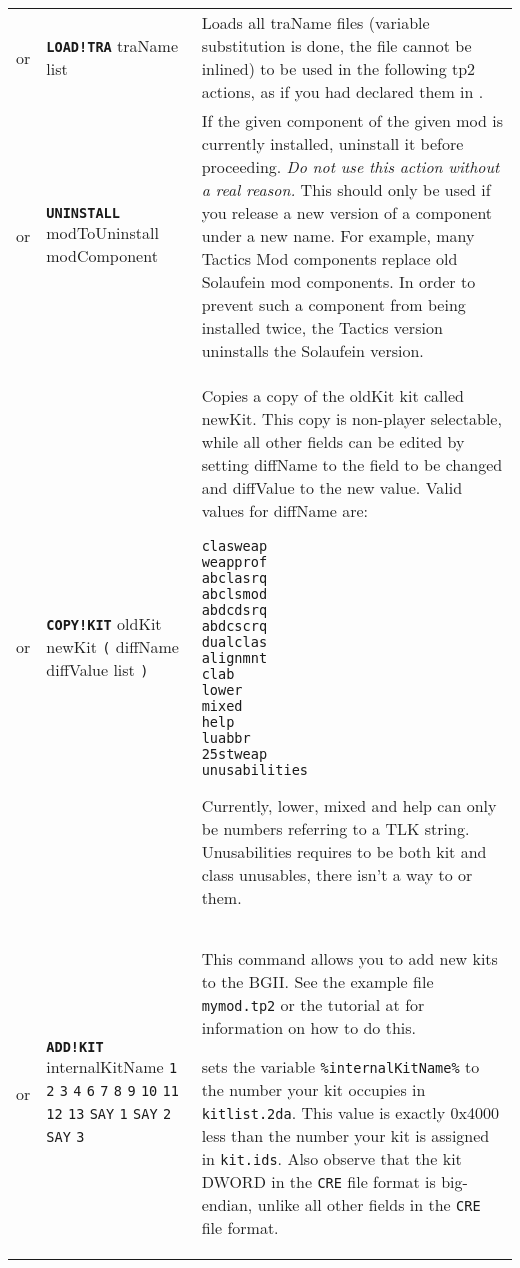 \documentclass{article}
\def\ttref#1{\ahrefloc{#1}{\tt #1}}
\def\DEFINE#1{{\tt \bf #1}\label{#1}\index{#1}}
\def\t#1{{\tt #1}}
\def\Slist{{\color{red} list }}
\begin{document}
\begin{tabular}{cp{10in}|p{10in}}
  or & \DEFINE{LOAD!TRA} traName \Slist &
    Loads all traName files (variable substitution is done, the file cannot be inlined)
    to be used in the following tp2 actions, as if you had declared them in \ttref{LANGUAGE}. \\
  or & \DEFINE{UNINSTALL} modToUninstall modComponent &
    If the given component of the given mod is currently installed,
    uninstall it before proceeding. \emph{Do not use this action without
	a real reason.} This
    should only be used if you release a new version of a component under a
    new name. For example, many Tactics Mod components replace old
    Solaufein mod components. In order to prevent such a component from
    being installed twice, the Tactics version uninstalls the Solaufein
    version.  \\
  or & \DEFINE{COPY!KIT} oldKit newKit \verb+(+ diffName diffValue \Slist
  \verb+)+ &
    Copies a copy of the oldKit kit called newKit. This copy is non-player
    selectable, while all other fields can be edited by setting diffName to
    the field to be changed and diffValue to the new value. Valid values for
    diffName are:
\begin{verbatim}
clasweap
weapprof
abclasrq
abclsmod
abdcdsrq
abdcscrq
dualclas
alignmnt
clab
lower
mixed
help
luabbr
25stweap
unusabilities
\end{verbatim}
    Currently, lower, mixed and help can only be numbers referring to a TLK
    string. Unusabilities requires to be both kit and class unusables, there
    isn't a way to \ttref{BAND} or \ttref{BOR} them.
    \\
  or & \DEFINE{ADD!KIT} internalKitName \t{\ttref{String}1}
       \t{\ttref{String}2} \t{\ttref{String}3} \t{\ttref{String}4}
       \t{\ttref{String}6} \t{\ttref{String}7} \t{\ttref{String}8}
       \t{\ttref{String}9} \t{\ttref{String}10} \t{\ttref{String}11}
       \t{\ttref{String}12} \t{\ttref{String}13} \t{SAY} \t{\ttref{text}1}
       \t{SAY} \t{\ttref{text}2} \t{SAY} \t{\ttref{text}3}
  &
    This command allows you to add new kits to the BGII.
    See the example file \t{mymod.tp2} or the tutorial at
    \ahrefurl{\url{http://forums.gibberlings3.net/index.php?showtopic=584}}
    for information on how to do this.

    \ttref{ADD!KIT} sets the variable \t{\%internalKitName\%} to the number
    your kit occupies in \t{kitlist.2da}. This value is exactly 0x4000 less
    than the number your kit is assigned in \t{kit.ids}. Also observe that
    the kit DWORD in the \t{CRE} file format is big-endian, unlike all
    other fields in the \t{CRE} file format.


\end{tabular}
\end{document}
